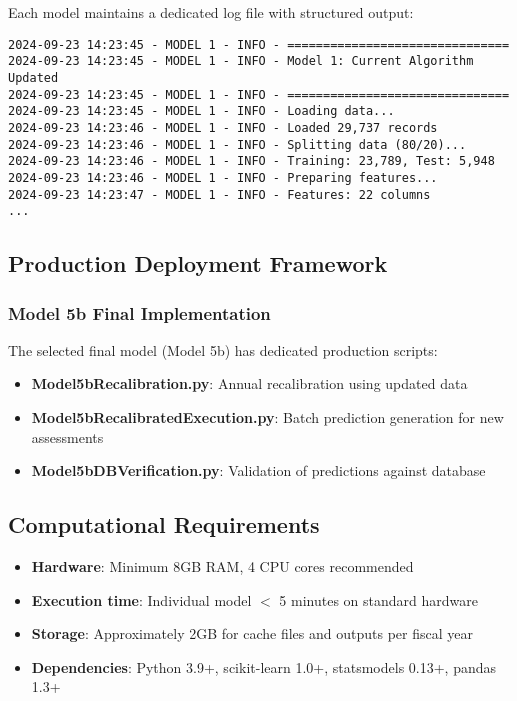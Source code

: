 Each model maintains a dedicated log file with structured output:

\begin{verbatim}
2024-09-23 14:23:45 - MODEL 1 - INFO - ===============================
2024-09-23 14:23:45 - MODEL 1 - INFO - Model 1: Current Algorithm Updated
2024-09-23 14:23:45 - MODEL 1 - INFO - ===============================
2024-09-23 14:23:45 - MODEL 1 - INFO - Loading data...
2024-09-23 14:23:46 - MODEL 1 - INFO - Loaded 29,737 records
2024-09-23 14:23:46 - MODEL 1 - INFO - Splitting data (80/20)...
2024-09-23 14:23:46 - MODEL 1 - INFO - Training: 23,789, Test: 5,948
2024-09-23 14:23:46 - MODEL 1 - INFO - Preparing features...
2024-09-23 14:23:47 - MODEL 1 - INFO - Features: 22 columns
...
\end{verbatim}

\subsection{Production Deployment Framework}

\subsubsection{Model 5b Final Implementation}

The selected final model (Model 5b) has dedicated production scripts:

\begin{itemize}
    \item \textbf{Model5bRecalibration.py}: Annual recalibration using updated data
    \item \textbf{Model5bRecalibratedExecution.py}: Batch prediction generation for new assessments
    \item \textbf{Model5bDBVerification.py}: Validation of predictions against database
\end{itemize}

\subsection{Computational Requirements}

\begin{itemize}
    \item \textbf{Hardware}: Minimum 8GB RAM, 4 CPU cores recommended
    \item \textbf{Execution time}: Individual model $<$ 5 minutes on standard hardware
    \item \textbf{Storage}: Approximately 2GB for cache files and outputs per fiscal year
    \item \textbf{Dependencies}: Python 3.9+, scikit-learn 1.0+, statsmodels 0.13+, pandas 1.3+
\end{itemize}

